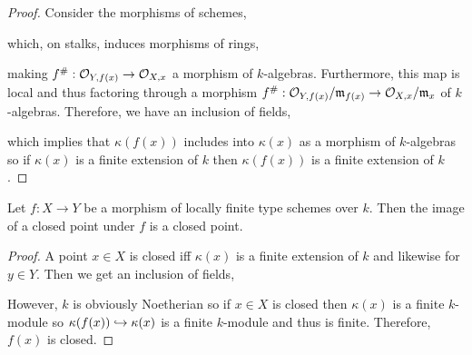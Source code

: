 \documentclass[12pt]{article}
\begin{document}
\begin{proof}
Consider the morphisms of schemes,
\begin{center}
\end{center}
which, on stalks, induces morphisms of rings, 
\begin{center}
\end{center}
making $f^\# : \mathcal{O}_{Y, f(x)} \to \mathcal{O}_{X, x}$ a morphism of $k$-algebras. Furthermore, this map is local and thus factoring through a morphism $f^\# : \mathcal{O}_{Y, f(x)} / \mathfrak{m}_{f(x)} \to \mathcal{O}_{X, x} / \mathfrak{m}_x$ of $k$-algebras. Therefore, we have an inclusion of fields,
\begin{center}
\end{center} 
which implies that $\kappa(f(x))$ includes into $\kappa(x)$ as a morphism of $k$-algebras so if $\kappa(x)$ is a finite extension of $k$ then $\kappa(f(x))$ is a finite extension of $k$. 
\end{proof}

\begin{corollary}
Let $f : X \to Y$ be a morphism of locally finite type schemes over $k$. Then the image of a closed point under $f$ is a closed point.
\end{corollary}

\begin{proof}
A point $x \in X$ is closed iff $\kappa(x)$ is a finite extension of $k$ and likewise for $y \in Y$. 
Then we get an inclusion of fields,
\begin{center}
\end{center}  
However, $k$ is obviously Noetherian so if $x \in X$ is closed then $\kappa(x)$ is a finite $k$-module so $\kappa(f(x)) \hookrightarrow \kappa(x)$ is a finite $k$-module and thus is finite. Therefore, $f(x)$ is closed. 
\end{proof}
\end{document}
